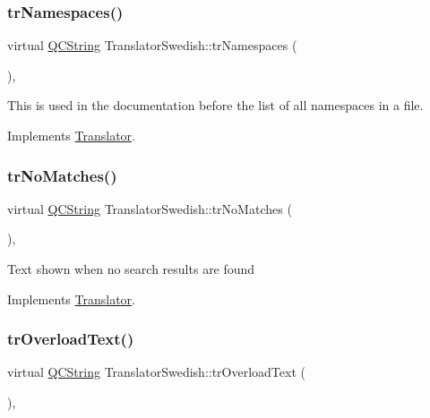 \subsubsection{\texorpdfstring{trNamespaces()}{trNamespaces()}}
{\footnotesize\ttfamily virtual \mbox{\hyperlink{class_q_c_string}{Q\+C\+String}} Translator\+Swedish\+::tr\+Namespaces (\begin{DoxyParamCaption}{ }\end{DoxyParamCaption})\hspace{0.3cm}{\ttfamily [inline]}, {\ttfamily [virtual]}}

This is used in the documentation before the list of all namespaces in a file. 

Implements \mbox{\hyperlink{class_translator}{Translator}}.

\mbox{\label{class_translator_swedish_ac81787ddadb102d3b16cf314f68b8b53}} 
\subsubsection{\texorpdfstring{trNoMatches()}{trNoMatches()}}
{\footnotesize\ttfamily virtual \mbox{\hyperlink{class_q_c_string}{Q\+C\+String}} Translator\+Swedish\+::tr\+No\+Matches (\begin{DoxyParamCaption}{ }\end{DoxyParamCaption})\hspace{0.3cm}{\ttfamily [inline]}, {\ttfamily [virtual]}}

Text shown when no search results are found 

Implements \mbox{\hyperlink{class_translator}{Translator}}.

\mbox{\label{class_translator_swedish_a4a34d3ed4469f79492c176f62895a3db}} 
\subsubsection{\texorpdfstring{trOverloadText()}{trOverloadText()}}
{\footnotesize\ttfamily virtual \mbox{\hyperlink{class_q_c_string}{Q\+C\+String}} Translator\+Swedish\+::tr\+Overload\+Text (\begin{DoxyParamCaption}{ }\end{DoxyParamCaption})\hspace{0.3cm}{\ttfamily [inline]}, {\ttfamily [virtual]}}

